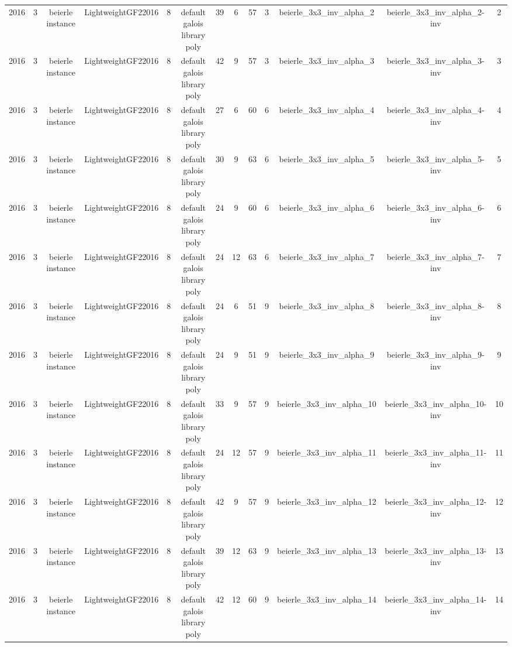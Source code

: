 \begin{tabular}{c c c c c c c c c c c c c}
2016 & 3 & beierle instance & LightweightGF22016 & 8 & default galois library poly & 39 & 6 & 57 & 3 & beierle_3x3_inv_alpha_2 & beierle_3x3_inv_alpha_2-inv & 2 \\
2016 & 3 & beierle instance & LightweightGF22016 & 8 & default galois library poly & 42 & 9 & 57 & 3 & beierle_3x3_inv_alpha_3 & beierle_3x3_inv_alpha_3-inv & 3 \\
2016 & 3 & beierle instance & LightweightGF22016 & 8 & default galois library poly & 27 & 6 & 60 & 6 & beierle_3x3_inv_alpha_4 & beierle_3x3_inv_alpha_4-inv & 4 \\
2016 & 3 & beierle instance & LightweightGF22016 & 8 & default galois library poly & 30 & 9 & 63 & 6 & beierle_3x3_inv_alpha_5 & beierle_3x3_inv_alpha_5-inv & 5 \\
2016 & 3 & beierle instance & LightweightGF22016 & 8 & default galois library poly & 24 & 9 & 60 & 6 & beierle_3x3_inv_alpha_6 & beierle_3x3_inv_alpha_6-inv & 6 \\
2016 & 3 & beierle instance & LightweightGF22016 & 8 & default galois library poly & 24 & 12 & 63 & 6 & beierle_3x3_inv_alpha_7 & beierle_3x3_inv_alpha_7-inv & 7 \\
2016 & 3 & beierle instance & LightweightGF22016 & 8 & default galois library poly & 24 & 6 & 51 & 9 & beierle_3x3_inv_alpha_8 & beierle_3x3_inv_alpha_8-inv & 8 \\
2016 & 3 & beierle instance & LightweightGF22016 & 8 & default galois library poly & 24 & 9 & 51 & 9 & beierle_3x3_inv_alpha_9 & beierle_3x3_inv_alpha_9-inv & 9 \\
2016 & 3 & beierle instance & LightweightGF22016 & 8 & default galois library poly & 33 & 9 & 57 & 9 & beierle_3x3_inv_alpha_10 & beierle_3x3_inv_alpha_10-inv & 10 \\
2016 & 3 & beierle instance & LightweightGF22016 & 8 & default galois library poly & 24 & 12 & 57 & 9 & beierle_3x3_inv_alpha_11 & beierle_3x3_inv_alpha_11-inv & 11 \\
2016 & 3 & beierle instance & LightweightGF22016 & 8 & default galois library poly & 42 & 9 & 57 & 9 & beierle_3x3_inv_alpha_12 & beierle_3x3_inv_alpha_12-inv & 12 \\
2016 & 3 & beierle instance & LightweightGF22016 & 8 & default galois library poly & 39 & 12 & 63 & 9 & beierle_3x3_inv_alpha_13 & beierle_3x3_inv_alpha_13-inv & 13 \\
2016 & 3 & beierle instance & LightweightGF22016 & 8 & default galois library poly & 42 & 12 & 60 & 9 & beierle_3x3_inv_alpha_14 & beierle_3x3_inv_alpha_14-inv & 14 \\

\end{tabular}
